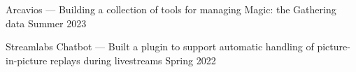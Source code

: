 Arcavios --- Building a collection of tools for managing Magic: the Gathering data  \hfill Summer 2023

Streamlabs Chatbot --- Built a plugin to support automatic handling of picture-in-picture replays during livestreams    \hfill Spring 2022
